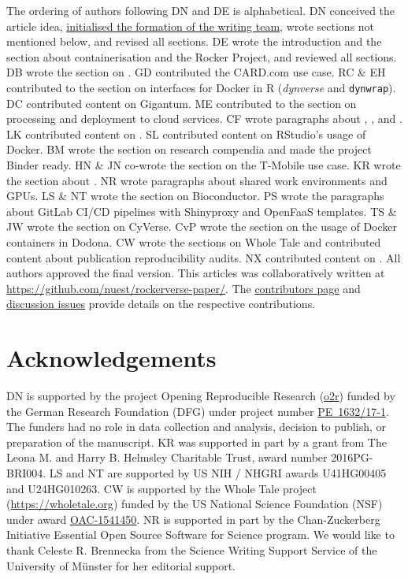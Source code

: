 The ordering of authors following DN and DE is alphabetical. DN
conceived the article idea,
\href{https://github.com/nuest/rockerverse-paper/issues/3}{initialised the formation of the writing team},
wrote sections not mentioned below, and revised all sections. DE wrote
the introduction and the section about containerisation and the Rocker
Project, and reviewed all sections. DB wrote the section on
. GD contributed the CARD.com use case. RC \& EH
contributed to the section on interfaces for Docker in R
(\emph{dynverse} and \texttt{dynwrap}). DC contributed content on
Gigantum. ME contributed to the section on processing and deployment to
cloud services. CF wrote paragraphs about ,
,  and . LK contributed content on
. SL contributed content on RStudio's usage of Docker. BM
wrote the section on research compendia and made the project Binder
ready. HN \& JN co-wrote the section on the T-Mobile use case. KR wrote
the section about . NR wrote paragraphs about shared work
environments and GPUs. LS \& NT wrote the section on Bioconductor. PS
wrote the paragraphs about GitLab CI/CD pipelines with Shinyproxy and
OpenFaaS templates. TS \& JW wrote the section on CyVerse. CvP wrote the
section on the usage of Docker containers in Dodona. CW wrote the
sections on Whole Tale and contributed content about publication
reproducibility audits. NX contributed content on . All
authors approved the final version. This articles was collaboratively
written at
\href{https://github.com/nuest/rockerverse-paper/}{https://github.com/nuest/rockerverse-paper/}.
The
\href{https://github.com/nuest/rockerverse-paper/graphs/contributors}{contributors page}
and
\href{https://github.com/nuest/rockerverse-paper/issues/}{discussion issues}
provide details on the respective contributions.

\hypertarget{acknowledgements}{%
\section{Acknowledgements}\label{acknowledgements}}

DN is supported by the project Opening Reproducible Research
(\href{https://www.uni-muenster.de/forschungaz/project/12343}{o2r})
funded by the German Research Foundation (DFG) under project number
\href{https://gepris.dfg.de/gepris/projekt/415851837}{PE~1632/17-1}. The
funders had no role in data collection and analysis, decision to
publish, or preparation of the manuscript. KR was supported in part by a
grant from The Leona M. and Harry B. Helmsley Charitable Trust, award
number 2016PG-BRI004. LS and NT are supported by US NIH / NHGRI awards
U41HG00405 and U24HG010263. CW is supported by the Whole Tale project
(\url{https://wholetale.org}) funded by the US National Science
Foundation (NSF) under award
\href{https://www.nsf.gov/awardsearch/showAward?AWD_ID=1541450}{OAC-1541450}.
NR is supported in part by the Chan-Zuckerberg Initiative Essential Open
Source Software for Science program. We would like to thank Celeste R.
Brennecka from the Science Writing Support Service of the University of
Münster for her editorial support.

